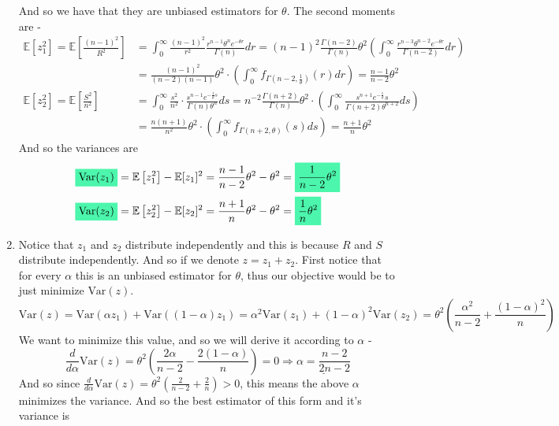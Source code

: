 \documentclass[../main.tex]{subfiles}
\begin{document}
\begin{enumerate}
    And so we have that they are unbiased estimators for $\theta$. The second moments are - 
    \begin{align*}
        \mathbb{E}\left[z_1^2\right] =\mathbb{E}\left[\frac{(n-1)^2}{R^2}\right] &= \int_0^\infty \frac{(n-1)^2}{r^2} \frac{r^{n-1}\theta^n e^{-\theta r}}{\Gamma(n)} dr = (n-1)^2\frac{\Gamma(n-2)}{\Gamma(n)}\theta^2\left(\int_0^\infty \frac{r^{n-3}\theta^{n-2}e^{-\theta r}}{\Gamma(n-2)}dr\right)\\ &= \frac{(n-1)^2}{(n-2)(n-1)}\theta^2\cdot \left(\int_0^{\infty}f_{\Gamma(n-2,\frac{1}{\theta})}(r)dr\right) = \frac{n-1}{n-2}\theta^2 \\
        \mathbb{E}\left[z_2^2\right] = \mathbb{E}\left[\frac{S^2}{n^2}\right] &= \int_0^{\infty}\frac{s^2}{n^2}\cdot\frac{s^{n-1}e^{-\frac{1}{\theta} s}}{\Gamma(n)\theta^n}ds = n^{-2}\frac{\Gamma(n+2)}{\Gamma(n)}\theta^2 \cdot\left(\int_0^{\infty}\frac{s^{n+1}e^{-\frac{1}{\theta}}s}{\Gamma(n+2)\theta^{n+2}} ds\right) \\ &=\frac{n(n+1)}{n^2}\theta^2\cdot \left(\int_0^{\infty}f_{\Gamma(n+2,\theta)}(s)ds\right) = \frac{n+1}{n}\theta^2
    \end{align*}
    And so the variances are
    \begin{align*}
        \mathcolorbox{goodcolor}{\text{Var}(z_1)} &= \mathbb{E}\left[z_1^2\right] - \mathbb{E}[z_1]^2 = \frac{n-1}{n-2}\theta^2 - \theta^2 = \mathcolorbox{goodcolor}{\frac{1}{n-2}\theta^2} \\
        \mathcolorbox{goodcolor}{\text{Var}(z_2)} &= \mathbb{E}\left[z_2^2\right] - \mathbb{E}[z_2]^2 = \frac{n+1}{n}\theta^2 - \theta^2 = \mathcolorbox{goodcolor}{\frac{1}{n}\theta^2}
    \end{align*}    
    \item Notice that $z_1$ and $z_2$ distribute independently and this is because $R$ and $S$ distribute independently. And so if we denote $z=z_1+z_2$. First notice that for every $\alpha$ this is an unbiased estimator for $\theta$, thus our objective would be to just minimize $\text{Var}(z)$.
    \[\text{Var}(z) = \text{Var}(\alpha z_1) + \text{Var}((1-\alpha)z_1) = \alpha^2\text{Var}(z_1)+(1-\alpha)^2\text{Var}(z_2) = \theta^2\left(\frac{\alpha^2}{n-2}+\frac{(1-\alpha)^2}{n}\right)\]
    We want to minimize this value, and so we will derive it according to $\alpha$ - 
    \[\frac{d}{d\alpha}\text{Var}(z) = \theta^2\left(\frac{2\alpha}{n-2} - \frac{2(1-\alpha)}{n}\right) = 0 \Longrightarrow \underline{\alpha=\frac{n-2}{2n-2}}\]
    And so since $\frac{d}{d\alpha}\text{Var}(z) = \theta^2\left(\frac{2}{n-2}+\frac{2}{n}\right)>0$, this means the above $\alpha$ minimizes the variance. And so the best estimator of this form and it's variance is 

\end{enumerate}
\end{document}
